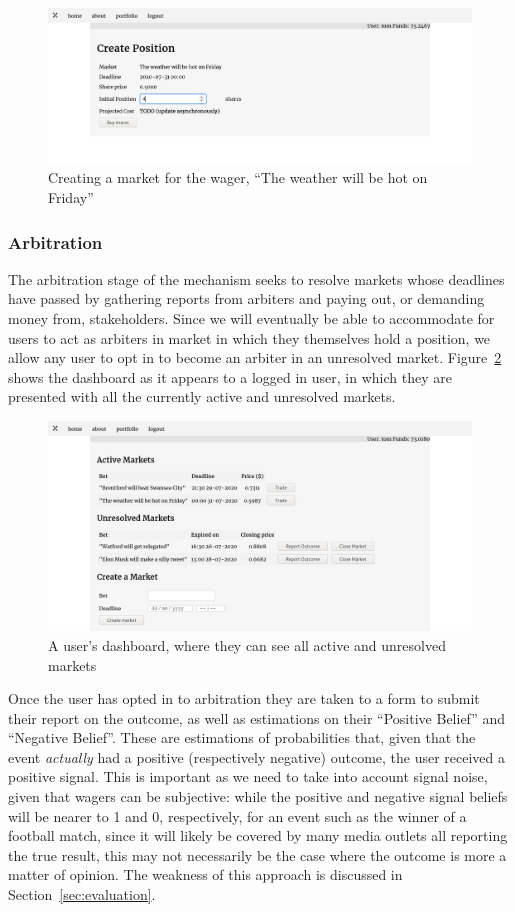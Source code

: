 \documentclass[10pt,a4paper]{article}
\theoremstyle{plain}
\theoremstyle{definition}
\begin{document}
\begin{figure}[h]
	\centering
	\includegraphics[width=.8\textwidth]{market-creation}
	\caption{Creating a market for the wager, ``The weather will be hot on
	Friday''}
	\label{fig:marketCreation}
\end{figure}

\subsubsection{Arbitration}

\label{sec:arbitration}

The arbitration stage of the mechanism seeks to resolve markets whose deadlines
have passed by gathering reports from arbiters and paying out, or demanding
money from, stakeholders. Since we will eventually be able to accommodate for
users to act as arbiters in market in which they themselves hold a position, we
allow any user to opt in to become an arbiter in an unresolved market.
Figure~\ref{fig:dashboard} shows the dashboard as it appears to a logged in
user, in which they are presented with all the currently active and unresolved
markets. 

\begin{figure}[h]
	\centering
	\includegraphics[width=.8\textwidth]{dashboard}
	\caption{A user's dashboard, where they can see all active and unresolved
	markets}
	\label{fig:dashboard}
\end{figure}

Once the user has opted in to arbitration they are taken to a form to submit
their report on the outcome, as well as estimations on their ``Positive
Belief'' and ``Negative Belief''. These are estimations of probabilities that,
given that the event \emph{actually} had a positive (respectively negative)
outcome, the user received a positive signal. This is important as we need to
take into account signal noise, given that wagers can be subjective: while the
positive and negative signal beliefs will be nearer to 1 and 0, respectively,
for an event such as the winner of a football match, since it will likely be
covered by many media outlets all reporting the true result, this may not
necessarily be the case where the outcome is more a matter of opinion. The
weakness of this approach is discussed in Section~\ref{sec:evaluation}.
\end{document}
